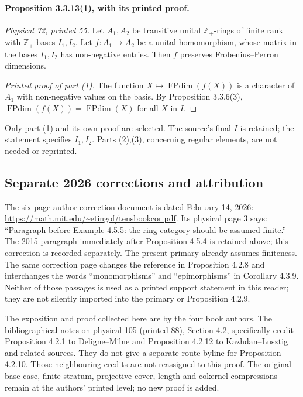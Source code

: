 \documentclass[11pt]{article}
\DeclareMathOperator{\FPdim}{FPdim}
\begin{document}
\paragraph{Proposition 3.3.13(1), with its printed proof.}
\emph{Physical 72, printed 55.}
Let $A_1,A_2$ be transitive unital $\mathbb Z_+$-rings of finite rank
with $\mathbb Z_+$-bases $I_1,I_2$. Let $f:A_1\to A_2$ be a unital
homomorphism, whose matrix in the bases $I_1,I_2$ has non-negative
entries. Then $f$ preserves Frobenius--Perron dimensions.
\begin{proof}[Printed proof of part (1)]
The function $X\mapsto\FPdim(f(X))$ is a character of $A_1$ with
non-negative values on the basis. By Proposition 3.3.6(3),
$\FPdim(f(X))=\FPdim(X)$ for all $X$ in $I$.
\end{proof}
Only part (1) and its own proof are selected. The source's final $I$
is retained; the statement specifies $I_1,I_2$. Parts (2),(3), concerning
regular elements, are not needed or reprinted.

\subsection*{Separate 2026 corrections and attribution}
The six-page author correction document is dated February 14, 2026:
\url{https://math.mit.edu/~etingof/tensbookcor.pdf}.
Its physical page 3 says: ``Paragraph before Example 4.5.5: the ring
category should be assumed finite.'' The 2015 paragraph immediately
after Proposition 4.5.4 is retained above; this correction is recorded
separately. The present primary already assumes finiteness.
The same correction page changes the reference in Proposition 4.2.8
and interchanges the words ``monomorphisms'' and ``epimorphisms'' in
Corollary 4.3.9. Neither of those passages is used as a printed support
statement in this reader; they are not silently imported into the
primary or Proposition 4.2.9.

The exposition and proof collected here are by the four book authors.
The bibliographical notes on physical 105 (printed 88), Section 4.2,
specifically credit Proposition 4.2.1 to Deligne--Milne and Proposition
4.2.12 to Kazhdan--Lusztig and related sources. They do not give a
separate route byline for Proposition 4.2.10. Those neighbouring credits
are not reassigned to this proof. The original base-case, finite-stratum,
projective-cover, length and cokernel compressions remain at the authors'
printed level; no new proof is added.
\end{document}
